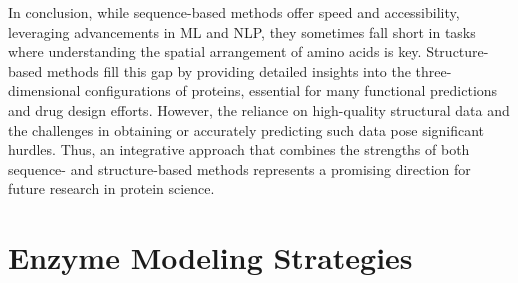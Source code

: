 In conclusion, while sequence-based methods offer speed and accessibility, leveraging advancements in ML and NLP, they sometimes fall short in tasks where understanding the spatial arrangement of amino acids is key. Structure-based methods fill this gap by providing detailed insights into the three-dimensional configurations of proteins, essential for many functional predictions and drug design efforts. However, the reliance on high-quality structural data and the challenges in obtaining or accurately predicting such data pose significant hurdles. Thus, an integrative approach that combines the strengths of both sequence- and structure-based methods represents a promising direction for future research in protein science.

\section{Enzyme Modeling Strategies}